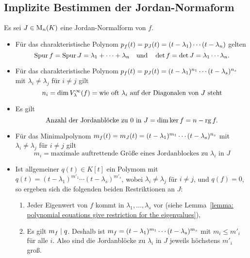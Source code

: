 


\subsection{Implizite Bestimmen der Jordan-Normaform}

Es sei $J \in \operatorname{M}_{n}(K)$ eine Jordan-Normalform von $f$.
\begin{itemize}
  \item
    Für das charakteristische Polynom $p_{f}(t) = p_{J}(t) = (t - \lambda_1) \dotsm (t - \lambda_n)$ gelten
    \[
        \operatorname{Spur} f
      = \operatorname{Spur} J
      = \lambda_1 + \dotsb + \lambda_n
    \quad\text{und}\quad
        \det f
      = \det J
      = \lambda_1 \dotsm \lambda_n.
    \]
  \item
    Für das charakteristische Polynom $p_{f}(t) = p_{J}(t) = (t - \lambda_1)^{n_1} \dotsm (t - \lambda_s)^{n_s}$ mit $\lambda_i \neq \lambda_j$ für $i \neq j$ gilt
    \[
        n_i
      = \dim V_{\lambda}^{\infty}(f)
      = \text{wie oft $\lambda_i$ auf der Diagonalen von $J$ steht}
    \]
  \item
    Es gilt
    \[
        \text{Anzahl der Jordanblöcke zu $0$ in $J$}
      = \dim \ker f
      = n - \operatorname{rg} f.
    \]
  \item
    Für das Minimalpolynom $m_{f}(t) = m_{J}(t) = (t - \lambda_1)^{m_1} \dotsm (t - \lambda_s)^{n_s}$ mit $\lambda_i \neq \lambda_j$ für $i \neq j$ gilt
    \[
        m_i
      = \text{maximale auftrettende Größe eines Jordanblockes zu $\lambda_i$ in $J$}
    \]
  \item
    Ist allgemeiner $q(t) \in K[t]$ ein Polymom mit $q(t) = (t - \lambda_1)^{m'_1} \dotsm (t - \lambda_s)^{m'_s}$, wobei $\lambda_i \neq \lambda_j$ für $i \neq j$, und $q(f) = 0$, so ergeben sich die folgenden beiden Restriktionen an $J$:
    \begin{enumerate}
      \item
        Jeder Eigenwert von $f$ kommt in $\lambda_1, \dotsc, \lambda_s$ vor (siehe Lemma~\ref{lemma: polynomial equations give restriction for the eigenvalues}),
      \item
        Es gilt $m_{f} \mid q$.
        Deshalb ist $m_{f} = (t - \lambda_1)^{m_1} \dotsm (t - \lambda_s)^{m_s}$ mit $m_i \leq m'_i$ für alle $i$.
        Also sind die Jordanblöcke zu $\lambda_i$ in $J$ jeweils höchstens $m'_i$ groß.
    \end{enumerate}
\end{itemize}

